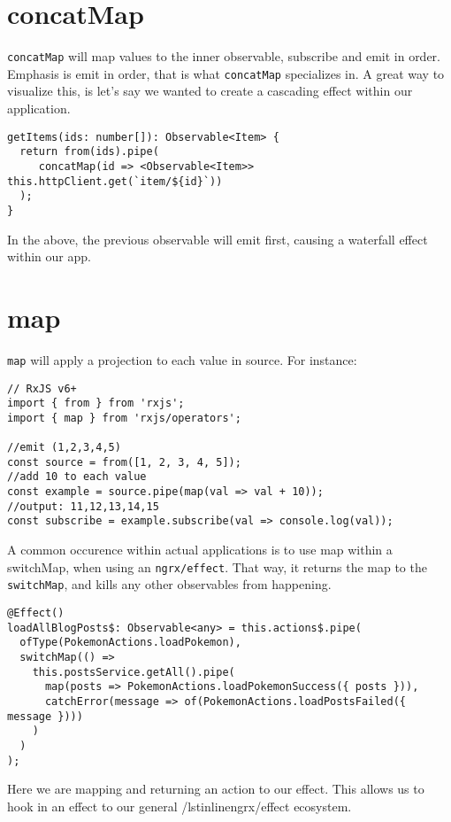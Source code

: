 \section{concatMap}
\lstinline{concatMap} will map values to the inner observable, subscribe and 
emit in order. Emphasis is emit in order, that is what \lstinline{concatMap} 
specializes in. A great way to visualize this, is let's say we wanted to 
create a cascading effect within our application. 

\begin{lstlisting}[caption=data-table.component.ts]
getItems(ids: number[]): Observable<Item> {
  return from(ids).pipe(
     concatMap(id => <Observable<Item>> this.httpClient.get(`item/${id}`))
  );
}
\end{lstlisting}

In the above, the previous observable will emit first, causing a waterfall 
effect within our app. 

\section{map} 
\lstinline{map} will apply a projection to each value in source. For instance: 
\begin{lstlisting}[caption=rxjs map example]
// RxJS v6+
import { from } from 'rxjs';
import { map } from 'rxjs/operators';

//emit (1,2,3,4,5)
const source = from([1, 2, 3, 4, 5]);
//add 10 to each value
const example = source.pipe(map(val => val + 10));
//output: 11,12,13,14,15
const subscribe = example.subscribe(val => console.log(val));
\end{lstlisting}

A common occurence within actual applications is to use map within a 
switchMap, when using an \lstinline{ngrx/effect}. That way, it returns the map
to the \lstinline{switchMap}, and kills any other observables from happening.

\begin{lstlisting}[caption=map example]
@Effect()
loadAllBlogPosts$: Observable<any> = this.actions$.pipe(
  ofType(PokemonActions.loadPokemon),
  switchMap(() =>
    this.postsService.getAll().pipe(
      map(posts => PokemonActions.loadPokemonSuccess({ posts })),
      catchError(message => of(PokemonActions.loadPostsFailed({ message })))
    )
  )
);  
\end{lstlisting}

Here we are mapping and returning an action to our effect. This allows us to 
hook in an effect to our general /lstinline{ngrx/effect} ecosystem.

